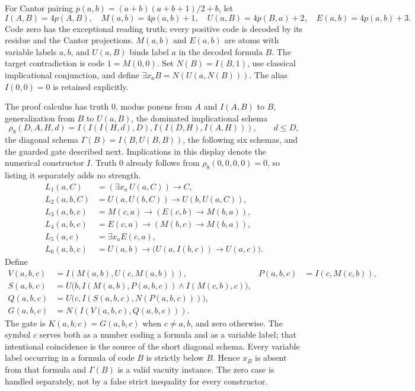 \documentclass[11pt,letterpaper]{article}
\begin{document}
For Cantor pairing $p(a,b)=(a+b)(a+b+1)/2+b$, let
\[
 I(A,B)=4p(A,B),\quad M(a,b)=4p(a,b)+1,\quad
 U(a,B)=4p(B,a)+2,\quad E(a,b)=4p(a,b)+3.
\]
Code zero has the exceptional reading truth; every positive code is
decoded by its residue and the Cantor projections. $M(a,b)$ and $E(a,b)$
are atoms with variable labels $a,b$, and $U(a,B)$ binds label $a$ in
the decoded formula $B$. The target contradiction is code $1=M(0,0)$.
Set $N(B)=I(B,1)$, use classical implicational conjunction, and define
$\exists x_a B=N(U(a,N(B)))$. The alias $I(0,0)=0$ is retained explicitly.

The proof calculus has truth 0, modus ponens from $A$ and $I(A,B)$ to
$B$, generalization from $B$ to $U(a,B)$, the dominated implicational
schema
\[
 \rho_8(D,A,H,d)=I(I(I(H,d),D),I(I(D,H),I(A,H))),\qquad d\le D,
\]
the diagonal schema $\Gamma(B)=I(B,U(B,B))$, the following six schemas,
and the guarded gate described next. Implications in this display denote
the numerical constructor $I$. Truth 0 already follows from
$\rho_8(0,0,0,0)=0$, so listing it separately adds no strength.
\begin{align*}
 L_1(a,C)&=(\exists x_a\,U(a,C))\to C,\\
 L_2(a,b,C)&=U(a,U(b,C))\to U(b,U(a,C)),\\
 L_3(a,b,c)&=M(c,a)\to(E(c,b)\to M(b,a)),\\
 L_4(a,b,c)&=E(c,a)\to(M(b,c)\to M(b,a)),\\
 L_5(a,c)&=\exists x_a E(c,a),\\
 L_6(a,b,c)&=U(a,b)\to\bigl(U(a,I(b,c))\to U(a,c)\bigr).
\end{align*}
Define
\begin{align*}
 V(a,b,c)&=I(M(a,b),U(c,M(a,b))),&P(a,b,c)&=I(c,M(c,b)),\\
 S(a,b,c)&=U\bigl(b,I(M(a,b),P(a,b,c))\wedge I(M(c,b),c)\bigr),\\
 Q(a,b,c)&=U\bigl(c,I(S(a,b,c),N(P(a,b,c)))\bigr),\\
 G(a,b,c)&=N(I(V(a,b,c),Q(a,b,c))).
\end{align*}
The gate is $K(a,b,c)=G(a,b,c)$ when $c\ne a,b$, and zero otherwise.
The symbol $c$ serves both as a number coding a formula and as a variable
label; that intentional coincidence is the source of the short diagonal
schema. Every variable label occurring in a formula of code $B$ is
strictly below $B$. Hence $x_B$ is absent from that formula and
$\Gamma(B)$ is a valid vacuity instance. The zero case is handled
separately, not by a false strict inequality for every constructor.
\end{document}
